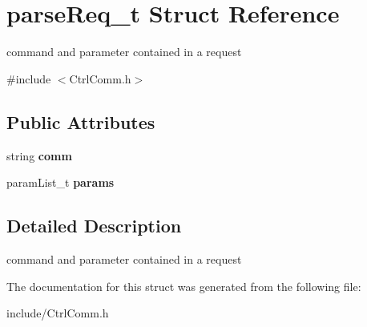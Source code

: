 \hypertarget{structparseReq__t}{}\section{parse\+Req\+\_\+t Struct Reference}
\label{structparseReq__t}


command and parameter contained in a request  




{\ttfamily \#include $<$Ctrl\+Comm.\+h$>$}

\subsection*{Public Attributes}
\begin{DoxyCompactItemize}
\item 
\mbox{\label{structparseReq__t_ad378450c6e9686f863a1d1bd98a9082d}} 
string {\bfseries comm}
\item 
\mbox{\label{structparseReq__t_a21860319f5f68e387a086abb9a71027a}} 
param\+List\+\_\+t {\bfseries params}
\end{DoxyCompactItemize}


\subsection{Detailed Description}
command and parameter contained in a request 

The documentation for this struct was generated from the following file\+:\begin{DoxyCompactItemize}
\item 
include/Ctrl\+Comm.\+h\end{DoxyCompactItemize}

